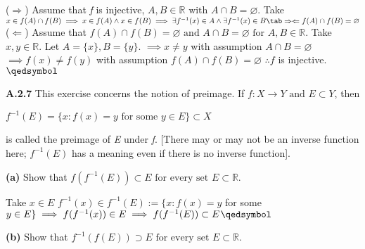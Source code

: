 \documentclass[12pt]{article}
\newcommand{\R}{\mathbb{R}}
\begin{document}
\begin{solution}\newline
($\Rightarrow$) Assume that \textit{f} is injective, $A,B\in\R\text{ with }A\cap B=\varnothing$.\newline
Take $x\in f(A)\cap f(B)\newline
\implies x\in f(A)\land x\in f(B)\newline
\implies \exists f^{-1}(x)\in A \land \exists f^{-1}(x)\in B\newline
\tab \Rightarrow\Leftarrow\newline
f(A)\cap f(B)=\varnothing$\newline
($\Leftarrow$) Assume that $f(A)\cap f(B)=\varnothing \text{ and } A\cap B=\varnothing\text{ for }A,B\in\R$.\newline
Take $x,y\in\R$. Let $A=\{x\}, B=\{y\}$.\newline
$\implies x\neq y$ with assumption $A\cap B=\varnothing$\newline
$\implies f(x)\neq f(y)$ with assumption $f(A)\cap f(B)=\varnothing$\newline
$\therefore f$ is injective.\flushright$\qedsymbol$
\end{solution}
\begin{problem}\textbf{A.2.7}
This exercise concerns the notion of preimage. If $f:X\to Y\text{ and } E\subset Y$, then
\begin{center}
    $f^{-1}(E)=\{x:f(x)=y\text{ for some }y\in E\}\subset X$
\end{center}
is called the preimage of \textit{E} under \textit{f}. [There may or may not be an inverse function here; $f^{-1}(E)$ has a meaning even if there is no inverse function].
\end{problem}
\begin{subproblem}\textbf{(a)}
Show that $f(f^{-1}(E))\subset E\text{ for every set }E\subset\R$.
\end{subproblem}

\begin{solution}\newline
Take $x\in E$\newline
$f^{-1}(x) \in f^{-1}(E):=\{x:f(x)=y$ for some $y\in E\}\newline
\implies f(f^{-1}(x))\in E\newline
\implies f(f^{-1}(E))\subset E$\flushright$\qedsymbol$
\end{solution}
\newpage
\begin{subproblem}\textbf{(b)}
Show that $f^{-1}(f(E))\supset E\text{ for every set }E\subset \R$.
\end{subproblem}
\end{document}
